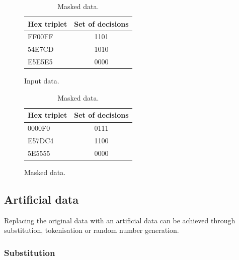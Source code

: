 \documentclass[a4paper,twoside,12pt]{book}
\begin{document}
\begin{table}
\centering
\caption{Randomisation – row shuffle.}
\begin{subfigure}{.4\textwidth}
\centering
\caption{Input data.}
\label{id:tab:record_randomisation_raw}
\begin{tabular}{lc}
\toprule
Hex triplet & Set of decisions \\ \midrule
FF00FF      & 1101             \\
54E7CD      & 1010             \\
E5E5E5      & 0000             \\ \bottomrule
\end{tabular}
\end{subfigure}
\begin{subfigure}{.4\textwidth}
\centering
\caption{Masked data.}
\label{id:tab:record_randomisation_masked}
\begin{tabular}{lc}
\toprule
Hex triplet & Set of decisions \\ \midrule
0000F0      & 0111             \\
E57DC4      & 1100             \\
5E5555      & 0000             \\ \bottomrule
\end{tabular}
\end{subfigure}
\end{table}


\subsection{Artificial data}

Replacing the original data with an artificial data can be achieved through substitution, tokenisation or random number generation.


\subsubsection{Substitution}
\end{document}
